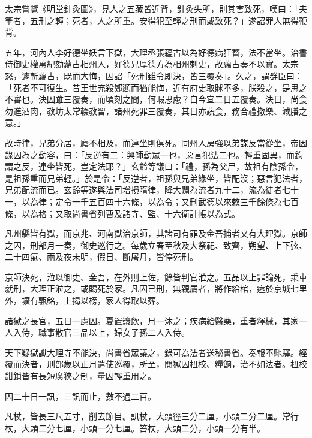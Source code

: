 \begin{pinyinscope}
 太宗嘗覽《明堂針灸圖》，見人之五藏皆近背，針灸失所，則其害致死，嘆曰：「夫箠者，五刑之輕；死者，人之所重。安得犯至輕之刑而或致死？」遂詔罪人無得鞭背。



 五年，河內人李好德坐妖言下獄，大理丞張蘊古以為好德病狂瞀，法不當坐。治書侍御史權萬紀劾蘊古相州人，好德兄厚德方為相州刺史，故蘊古奏不以實。太宗怒，遽斬蘊古，既而大悔，因詔「死刑雖令即決，皆三覆奏」。久之，謂群臣曰：「死者不可復生。昔王世充殺鄭頲而猶能悔，近有府史取賕不多，朕殺之，是思之不審也。決囚雖三覆奏，而頃刻之間，何暇思慮？自今宜二日五覆奏。決日，尚食勿進酒肉，教坊太常輟教習，諸州死罪三覆奏，其日亦蔬食，務合禮撤樂、減膳之意。」



 故時律，兄弟分居，廕不相及，而連坐則俱死。同州人房強以弟謀反當從坐，帝因錄囚為之動容，曰：「反逆有二：興師動眾一也，惡言犯法二也。輕重固異，而鈞謂之反，連坐皆死，豈定法耶？」玄齡等議曰：「禮，孫為父尸，故祖有陰孫令，是祖孫重而兄弟輕。」於是令：「反逆者，祖孫與兄弟緣坐，皆配沒；惡言犯法者，兄弟配流而已。玄齡等遂與法司增損隋律，降大闢為流者九十二，流為徒者七十一，以為律；定令一千五百四十六條，以為令；又刪武德以來敕三千餘條為七百條，以為格；又取尚書省列曹及諸寺、監、十六衛計帳以為式。



 凡州縣皆有獄，而京兆、河南獄治京師，其諸司有罪及金吾捕者又有大理獄。京師之囚，刑部月一奏，御史巡行之。每歲立春至秋及大祭祀、致齊，朔望、上下弦、二十四氣、雨及夜未明，假日、斷屠月，皆停死刑。



 京師決死，涖以御史、金吾，在外則上佐，餘皆判官涖之。五品以上罪論死，乘車就刑，大理正涖之，或賜死於家。凡囚已刑，無親屬者，將作給棺，瘞於京城七里外，壙有甎銘，上揭以榜，家人得取以葬。



 諸獄之長官，五日一慮囚。夏置漿飲，月一沐之；疾病給醫藥，重者釋械，其家一人入侍，職事散官三品以上，婦女子孫二人入侍。



 天下疑獄讞大理寺不能決，尚書省眾議之，錄可為法者送秘書省。奏報不馳驛。經覆而決者，刑部歲以正月遣使巡覆，所至，閱獄囚杻校、糧餉，治不如法者。杻校鉗鎖皆有長短廣狹之制，量囚輕重用之。



 囚二十日一訊，三訊而止，數不過二百。



 凡杖，皆長三尺五寸，削去節目。訊杖，大頭徑三分二厘，小頭二分二厘。常行杖，大頭二分七厘，小頭一分七厘。笞杖，大頭二分，小頭一分有半。




\end{pinyinscope}
